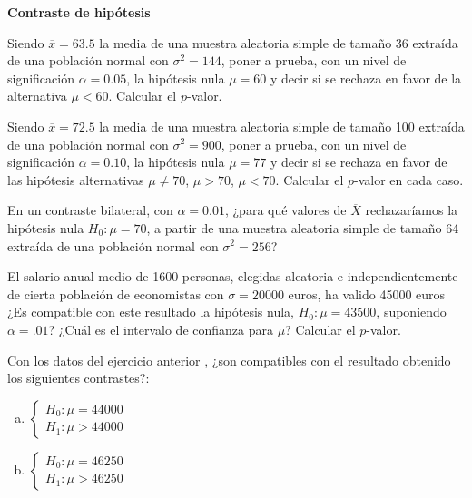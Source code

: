 \documentclass[12pt]{article}\usepackage[]{graphicx}\usepackage[]{color}
\begin{document}
\textbf{Contraste de hipótesis}

\begin{prob}%
Siendo $\overline{x}=63.5$ la media de una muestra aleatoria simple de tamaño 36 extraída
de una población normal con $\sigma^2=144$, poner
a prueba, con un nivel de significación $\alpha=0.05$, la hipótesis
nula $\mu=60$ y decir si se rechaza en favor de la alternativa
$\mu<60$. Calcular el $p$-valor.
\end{prob}

\begin{prob}%
Siendo $\overline{x}=72.5$ la media de una muestra aleatoria simple de tamaño 100 extraída
de una población normal con $\sigma^2=900$, poner
a prueba, con un nivel de significación $\alpha=0.10$, la hipótesis
nula $\mu=77$ y decir si se rechaza en favor de las hipótesis
alternativas
$\mu\not= 70$, $ \mu>70$, $\mu<70$. Calcular el $p$-valor en cada caso.
\end{prob}


\begin{prob}%
En un contraste bilateral, con $\alpha=0.01$, ¿para qué valores
de $\overline{X}$ rechazaríamos  la hipótesis nula $H_{0}:\mu=70$, a
partir de una muestra aleatoria simple de tamaño 64 extraída de una
población normal con $\sigma^2=256$?
\end{prob}

\begin{prob}%
El salario anual medio de 1600 personas, elegidas aleatoria e
independientemente de cierta población de economistas con $\sigma=20000$ euros, ha
valido 45000 euros  ¿Es compatible  con este resultado la hipótesis
nula, $H_{0}:\mu=43500$, suponiendo $\alpha=.01$? ¿Cuál es el intervalo
de confianza para $\mu$? Calcular el $p$-valor.
\end{prob}

\begin{prob}%
Con los datos del ejercicio anterior , ¿son compatibles con el
resultado obtenido los siguientes contrastes?:
\begin{enumerate}[a)]
\item $\left\{\begin{array}{ll} H_{0}:\mu=44000\\
H_{1}:\mu>44000\end{array}\right.$
\item $\left\{\begin{array}{ll} H_{0}:\mu=46250\\
H_{1}:\mu>46250\end{array}\right.$
\end{enumerate}
\end{prob}
\end{document}
